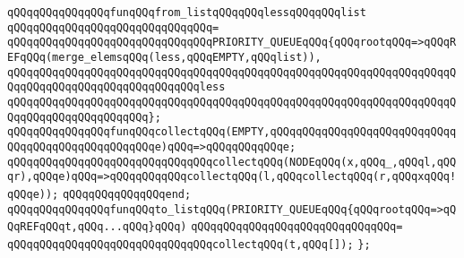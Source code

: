 \verb|qQQqqQQqqQQqqQQqfunqQQqfrom_listqQQqqQQqlessqQQqqQQqlist|\newline
\verb|qQQqqQQqqQQqqQQqqQQqqQQqqQQqqQQq=|\newline
\verb|qQQqqQQqqQQqqQQqqQQqqQQqqQQqqQQqPRIORITY_QUEUEqQQq{qQQqrootqQQq=>qQQqREFqQQq(merge_elemsqQQq(less,qQQqEMPTY,qQQqlist)),|\newline
\verb|qQQqqQQqqQQqqQQqqQQqqQQqqQQqqQQqqQQqqQQqqQQqqQQqqQQqqQQqqQQqqQQqqQQqqQQqqQQqqQQqqQQqqQQqqQQqqQQqqQQqless|\newline
\verb|qQQqqQQqqQQqqQQqqQQqqQQqqQQqqQQqqQQqqQQqqQQqqQQqqQQqqQQqqQQqqQQqqQQqqQQqqQQqqQQqqQQqqQQqqQQq};|\newline
\newline
\newline
\verb|qQQqqQQqqQQqqQQqfunqQQqcollectqQQq(EMPTY,qQQqqQQqqQQqqQQqqQQqqQQqqQQqqQQqqQQqqQQqqQQqqQQqqQQqe)qQQq=>qQQqqQQqqQQqe;|\newline
\verb|qQQqqQQqqQQqqQQqqQQqqQQqqQQqqQQqcollectqQQq(NODEqQQq(x,qQQq_,qQQql,qQQqr),qQQqe)qQQq=>qQQqqQQqqQQqcollectqQQq(l,qQQqcollectqQQq(r,qQQqxqQQq!qQQqe));|\newline
\verb|qQQqqQQqqQQqqQQqend;|\newline
\newline
\newline
\verb|qQQqqQQqqQQqqQQqfunqQQqto_listqQQq(PRIORITY_QUEUEqQQq{qQQqrootqQQq=>qQQqREFqQQqt,qQQq...qQQq}qQQq)|\newline
\verb|qQQqqQQqqQQqqQQqqQQqqQQqqQQqqQQq=|\newline
\verb|qQQqqQQqqQQqqQQqqQQqqQQqqQQqqQQqcollectqQQq(t,qQQq[]);|\newline
\newline
\verb|};|\newline
\newline
\newline

